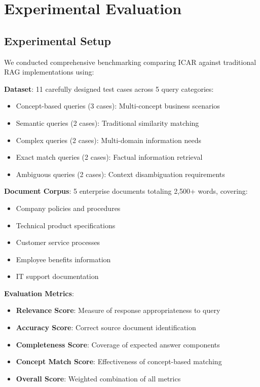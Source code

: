 \documentclass[11pt]{article}
\begin{document}
\section{Experimental Evaluation}

\subsection{Experimental Setup}

We conducted comprehensive benchmarking comparing ICAR against traditional RAG implementations using:

\textbf{Dataset}: 11 carefully designed test cases across 5 query categories:
\begin{itemize}
\item Concept-based queries (3 cases): Multi-concept business scenarios
\item Semantic queries (2 cases): Traditional similarity matching
\item Complex queries (2 cases): Multi-domain information needs
\item Exact match queries (2 cases): Factual information retrieval
\item Ambiguous queries (2 cases): Context disambiguation requirements
\end{itemize}

\textbf{Document Corpus}: 5 enterprise documents totaling 2,500+ words, covering:
\begin{itemize}
\item Company policies and procedures
\item Technical product specifications
\item Customer service processes
\item Employee benefits information
\item IT support documentation
\end{itemize}

\textbf{Evaluation Metrics}:
\begin{itemize}
\item \textbf{Relevance Score}: Measure of response appropriateness to query
\item \textbf{Accuracy Score}: Correct source document identification
\item \textbf{Completeness Score}: Coverage of expected answer components
\item \textbf{Concept Match Score}: Effectiveness of concept-based matching
\item \textbf{Overall Score}: Weighted combination of all metrics
\end{itemize}
\end{document}
